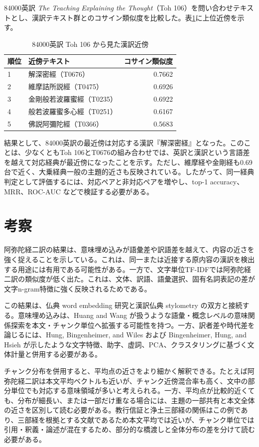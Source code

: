 \documentclass[uplatex,dvipdfmx,11pt,a4paper]{jsarticle}
\begin{document}
84000英訳 \textit{The Teaching Explaining the Thought}（Toh 106）を問い合わせテキストとし、漢訳テキスト群とのコサイン類似度を比較した。表\ref{tab:multilingual-pilot}に上位近傍を示す。

\begin{table}[H]
\centering
\caption{84000英訳 Toh 106 から見た漢訳近傍}
\label{tab:multilingual-pilot}
\begin{tabular}{llr}
\toprule
順位 & 近傍テキスト & コサイン類似度 \\
\midrule
1 & 解深密經（T0676） & 0.7662 \\
2 & 維摩詰所説經（T0475） & 0.6926 \\
3 & 金剛般若波羅蜜經（T0235） & 0.6922 \\
4 & 般若波羅蜜多心經（T0251） & 0.6167 \\
5 & 佛説阿彌陀經（T0366） & 0.5683 \\
\bottomrule
\end{tabular}
\end{table}

結果として、84000英訳の最近傍は対応する漢訳『解深密経』となった。このことは、少なくともToh 106とT0676の組み合わせでは、英訳と漢訳という言語差を越えて対応経典が最近傍になったことを示す。ただし、維摩経や金剛経も0.69台で近く、大乗経典一般の主題的近さも反映されている。したがって、同一経典判定として評価するには、対応ペアと非対応ペアを増やし、top-1 accuracy、MRR、ROC-AUC などで検証する必要がある。

\section{考察}

阿弥陀経二訳の結果は、意味埋め込みが語彙差や訳語差を越えて、内容の近さを強く捉えることを示している。これは、同一または近接する原内容の漢訳を検出する用途には有用である可能性がある。一方で、文字単位TF-IDFでは阿弥陀経二訳の類似度が低く出た。これは、文体、訳語、語彙選択、固有名詞表記の差が文字n-gram特徴に強く反映されるためである。

この結果は、仏典 word embedding 研究と漢訳仏典 stylometry の双方と接続する。意味埋め込みは、Huang and Wang が扱うような語彙・概念レベルの意味関係探索\cite{huang2023}を本文・チャンク単位へ拡張する可能性を持つ。一方、訳者差や時代差を論じるには、Hung, Bingenheimer, and Wiles および Bingenheimer, Hung, and Hsieh が示したような文字特徴、助字、虚詞、PCA、クラスタリングに基づく文体計量\cite{hung2010,bingenheimer2017}と併用する必要がある。

チャンク分布を併用すると、平均点の近さをより細かく解釈できる。たとえば阿弥陀経二訳は本文平均ベクトルも近いが、チャンク近傍混合率も高く、文中の部分単位でも対応する意味領域が多いと考えられる。一方、平均点が比較的近くても、分布が細長い、または一部だけ重なる場合には、主題の一部共有と本文全体の近さを区別して読む必要がある。教行信証と浄土三部経の関係はこの例であり、三部経を根拠とする文献であるため本文平均では近いが、チャンク単位では引用・釈義・論述が混在するため、部分的な橋渡しと全体分布の差を分けて読む必要がある。
\end{document}
